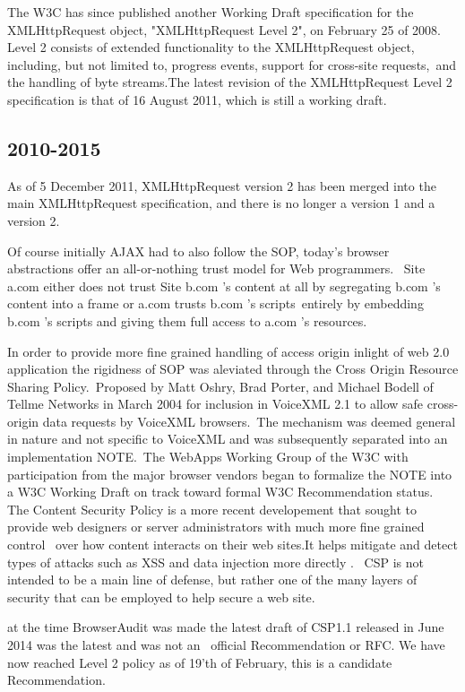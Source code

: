 The W3C has since published another Working Draft specification for the XMLHttpRequest object, "XMLHttpRequest Level 2", on February 25 of 2008.
Level 2 consists of extended functionality to the XMLHttpRequest object, including, but not limited to, progress events, support for cross-site requests,\
and the handling of byte streams.The latest revision of the XMLHttpRequest Level 2 specification is that of 16 August 2011, which is still a working draft.\

\subsection{2010-2015}

As of 5 December 2011, XMLHttpRequest version 2 has been merged into the main XMLHttpRequest specification, and there is no longer a version 1 and a version 2.\

Of course initially AJAX had to also follow the SOP, today’s browser abstractions offer an all-or-nothing trust model for Web programmers. \
Site a.com either does not trust Site b.com ’s content at all by segregating b.com ’s content into a frame or a.com trusts b.com ’s scripts\
entirely by embedding b.com ’s scripts and giving them full access to a.com ’s resources.\

In order to provide more fine grained handling of access origin inlight of web 2.0 application the rigidness of SOP was aleviated through the Cross Origin Resource Sharing Policy.\
Proposed by Matt Oshry, Brad Porter, and Michael Bodell of Tellme Networks in March 2004 for inclusion in VoiceXML 2.1 to allow safe cross-origin data requests by VoiceXML browsers.\
The mechanism was deemed general in nature and not specific to VoiceXML and was subsequently separated into an implementation NOTE.\
The WebApps Working Group of the W3C with participation from the major browser vendors began to formalize the NOTE into a W3C Working Draft on track toward formal W3C Recommendation status.\\

The Content Security Policy is a more recent developement that sought to provide web designers or server administrators with much more fine grained control \
over how content interacts on their web sites.It helps mitigate and detect types of attacks such as XSS and data injection more directly . \
CSP is not intended to be a main line of defense, but rather one of the many layers of security that can be employed to help secure a web site.\

at the time BrowserAudit was made the latest draft of CSP1.1 released in June 2014 was the latest and was not an \
official Recommendation or RFC. We have now reached Level 2 policy as of 19'th of February,\cite{csp} this is a candidate Recommendation.\

